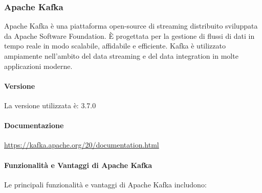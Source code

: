 \subsubsection{Apache Kafka}

Apache Kafka è una piattaforma open-source di streaming distribuito sviluppata da Apache Software Foundation. È progettata per la gestione di flussi di dati in tempo reale in modo scalabile, affidabile e efficiente. Kafka è utilizzato ampiamente nell'ambito del data streaming e del data integration in molte applicazioni moderne.
\paragraph{Versione}
La versione utilizzata è: 3.7.0
\paragraph{Documentazione}
\href{https://kafka.apache.org/20/documentation.html}{https://kafka.apache.org/20/documentation.html}

\paragraph{Funzionalità e Vantaggi di Apache Kafka}
Le principali funzionalità e vantaggi di Apache Kafka includono:

